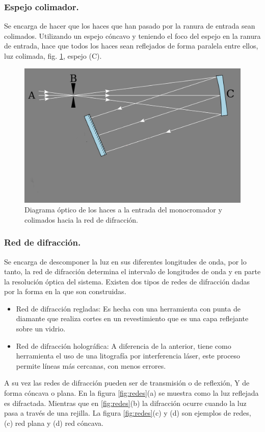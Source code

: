 \subsubsection{Espejo colimador.}
Se encarga de hacer que los haces que han pasado por la ranura de entrada sean colimados. Utilizando un espejo cóncavo y teniendo el foco del espejo en la ranura de entrada, hace que todos los haces sean reflejados de forma paralela entre ellos, luz colimada, fig. \ref{fig:colimarluz}, espejo (C). 

\begin{figure}[h]
	\centering
	\includegraphics[width=0.6\linewidth]{Imagenes/ColimarLuz}
	\caption{Diagrama óptico de los haces a la entrada del monocromador y colimados hacia la red de difracción. \cite{Czerny-Turney-Conf}}
	\label{fig:colimarluz}
\end{figure}

\subsubsection{Red de difracción.}
Se encarga de descomponer la luz en sus diferentes longitudes de onda, por lo tanto, la red de difracción determina el intervalo de longitudes de onda y en parte la resolución óptica del sistema. 
Existen dos tipos de redes de difracción dadas por la forma en la que son construidas.
\begin{itemize}
	\item Red de difracción regladas: Es hecha con una herramienta con punta de diamante que realiza cortes en un revestimiento que es una capa reflejante sobre un vidrio.
	\item Red de difracción holográfica: A diferencia de la anterior, tiene como herramienta el uso de una litografía por interferencia láser, este proceso permite líneas más cercanas, con menos errores.
\end{itemize}

A su vez las redes de difracción pueden ser de transmisión o de reflexión, Y de forma cóncava o plana. En la figura \ref{fig:redes}(a) se muestra como la luz reflejada es difractada. Mientras que en \ref{fig:redes}(b) la difracción ocurre cuando la luz pasa a través de una rejilla. La figura \ref{fig:redes}(c) y (d) son ejemplos de redes, (c) red plana y (d) red cóncava.

